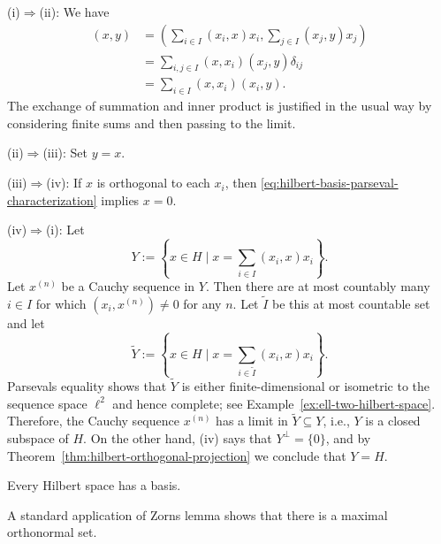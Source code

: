 \begin{Proof}
(i)$\Rightarrow$(ii): We have
\begin{equation}\label{eq:hilbert-basis-double-sum-inner-product}
\begin{aligned}
(x,y)&=\left(\sum_{i\in I}(x_i,x)x_i,\sum_{j\in I}(x_j,y)x_j\right)\\
&=\sum_{i,j\in I}(x,x_i)(x_j,y)\delta_{ij}\\
&=\sum_{i\in I}(x,x_i)(x_i,y).
\end{aligned}
\end{equation}
The exchange of summation and inner product is justified in the usual way by considering finite sums and then passing to the limit.

(ii)$\Rightarrow$(iii): Set $y=x$.

(iii)$\Rightarrow$(iv): If $x$ is orthogonal to each $x_i$, then \eqref{eq:hilbert-basis-parseval-characterization} implies $x=0$.

(iv)$\Rightarrow$(i): Let
\begin{equation}\label{eq:orthonormal-family-expansion-subspace}
Y:=\left\{x\in H\mid x=\sum_{i\in I}(x_i,x)x_i\right\}.
\end{equation}
Let $x^{(n)}$ be a Cauchy sequence in $Y$. Then there are at most countably many $i\in I$ for which $(x_i,x^{(n)})\ne0$ for any $n$. Let $\widetilde I$ be this at most countable set and let
\begin{equation}\label{eq:countable-orthonormal-expansion-subspace}
\widetilde Y:=\left\{x\in H\mid x=\sum_{i\in\widetilde I}(x_i,x)x_i\right\}.
\end{equation}
Parseval\textquotesingle s equality shows that $\widetilde Y$ is either finite-dimensional or isometric to the sequence space $\ell^2$ and hence complete; see Example~\ref{ex:ell-two-hilbert-space}. Therefore, the Cauchy sequence $x^{(n)}$ has a limit in $\widetilde Y\subseteq Y$, i.e., $Y$ is a closed subspace of $H$. On the other hand, (iv) says that $Y^\perp=\{0\}$, and by Theorem~\ref{thm:hilbert-orthogonal-projection} we conclude that $Y=H$.
\end{Proof}

\begin{Corollary}
\label{cor:hilbert-basis-existence}
Every Hilbert space has a basis.
\end{Corollary}

\begin{Proof}
A standard application of Zorn\textquotesingle s lemma shows that there is a maximal orthonormal set.
\end{Proof}

